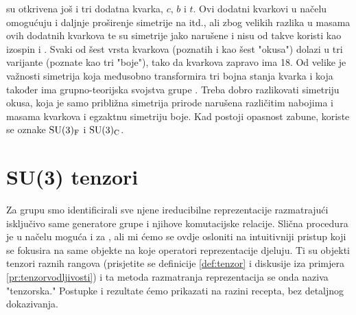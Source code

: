 su otkrivena još i tri dodatna kvarka, $c$, $b$ i $t$. Ovi dodatni
kvarkovi u načelu omogućuju i daljnje proširenje simetrije
na  itd., ali zbog velikih razlika u masama ovih dodatnih kvarkova
te su simetrije jako narušene i nisu od takve koristi kao
izospin i .
Svaki od šest vrsta kvarkova (poznatih i kao šest "okusa") 
dolazi u tri varijante (poznate kao tri "boje"), tako da kvarkova
zapravo ima 18. Od velike je važnosti simetrija koja međusobno
transformira tri bojna stanja kvarka i koja također ima grupno-teorijska
svojstva grupe . 
Treba dobro razlikovati simetriju  okusa, koja je samo približna
simetrija prirode narušena različitim nabojima i masama kvarkova
i egzaktnu simetriju  boje. Kad postoji opasnost zabune,
koriste se oznake $\mathrm{SU}(3)_{\mathrm{F}}$ i $\mathrm{SU}(3)_{\mathrm{C}}$.


\section{SU(3) tenzori}

Za grupu  smo identificirali sve njene ireducibilne reprezentacije
razmatrajući isključivo same generatore grupe i njihove komutacijske relacije.
Slična procedura je u načelu moguća i za , ali mi ćemo se ovdje osloniti
na intuitivniji pristup koji se fokusira na same objekte na koje operatori
reprezentacije djeluju. Ti su objekti  tenzori raznih rangova
(prisjetite se definicije \ref{def:tenzor} i diskusije iza primjera
\ref{pr:tenzorvodljivosti})
i ta metoda razmatranja reprezentacija se onda naziva "tenzorska."
Postupke i rezultate ćemo prikazati na razini recepta, bez detaljnog dokazivanja.


